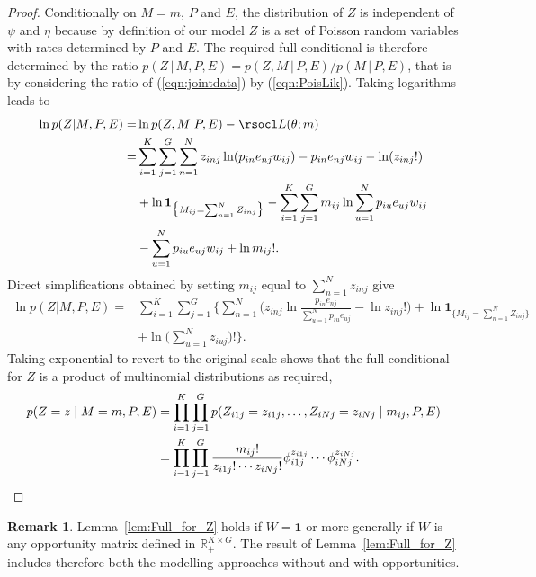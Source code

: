\documentclass[11pt]{amsart}
\theoremstyle{definition}
\newtheorem{remark}[theorem]{Remark}
\begin{document}
\begin{proof}
Conditionally on $M = m$, $P$ and $E$, the distribution of $Z$ is
independent of $\psi$ and $\eta$ because by definition of our model
$Z$ is a set of Poisson random variables with rates determined by $P$
and $E$. The required full conditional is therefore determined by the
ratio $p(Z\,|\,M, P, E) = p(Z, M\,|\, P,E)/p(M\,|\,P, E)$, that is by
considering the ratio of (\ref{eqn:jointdata}) by
(\ref{eqn:PoisLik}). Taking logarithms leads to
\begin{align*}
    \ln p(Z|M, P, E)
  =&
    \ln p(Z, M|P, E) - \rsocl L(\theta; m) \\
  =&
    \sum_{i=1}^K \sum_{j=1}^G \sum_{n=1}^N z_{inj}
     \ln(p_{in}e_{nj}w_{ij}) -
     p_{in}e_{nj}w_{ij} - \ln(z_{inj}!) \\
    & + \ln \mathbf{1}_{\big\{M_{ij} =
     \sum_{n=1}^N Z_{inj}\big\}}
     -\sum_{i=1}^K \sum_{j=1}^G m_{ij}\ln \sum_{u=1}^N
      p_{iu}e_{uj}w_{ij} \\
    & - \sum_{u=1}^N p_{iu}e_{uj}w_{ij} + \ln m_{ij}!.
\end{align*}
Direct simplifications obtained by  setting $m_{ij}$ equal to
$\sum_{n=1}^N  z_{inj}$ give
\begin{align*}
    \ln p(Z|M, P, E)
  =&
    \sum_{i=1}^K \sum_{j=1}^G\Big\{
       \sum_{n=1}^N \Big(
           z_{inj} \ln\frac{p_{in}e_{nj}}{\sum_{u=1}^N
           p_{iu}e_{uj}} - \ln z_{inj}!
       \Big) +
       \ln \mathbf{1}_{\big\{M_{ij} = \sum_{n=1}^N Z_{inj}
     \big\}} \\
     &+ \ln \big(\sum_{u=1}^N z_{iuj}\big)!
   \Big\}.
\end{align*}
Taking exponential to revert to the original scale shows that
the full conditional for $Z$ is a product of multinomial
distributions as required,
\begin{align}
       p(Z = z\mid M = m, P, E)
     &=
       \prod_{i=1}^K \prod_{j=1}^G
       p(Z_{i1j} = z_{i1j}, \ldots, Z_{iNj} =
       z_{iNj}\mid m_{ij}, P, E) \notag\\
     &=
       \prod_{i=1}^K \prod_{j=1}^G
       \frac{m_{ij}!}{z_{i1j}!\cdots z_{iNj}!}
        \phi_{i1j}^{z_{i1j}} \cdots
       \phi_{iNj}^{z_{iNj}}. \notag\qedhere
\end{align}
\end{proof}

\begin{remark} Lemma~\ref{lem:Full_for_Z} holds if $W=\mathbf 1$ or
more generally if $W$ is any opportunity matrix defined in $\mathbb
R^{K\times G}_+$. The result of Lemma~\ref{lem:Full_for_Z} includes
therefore both the modelling approaches without and with
opportunities.
\end{remark}
\end{document}
